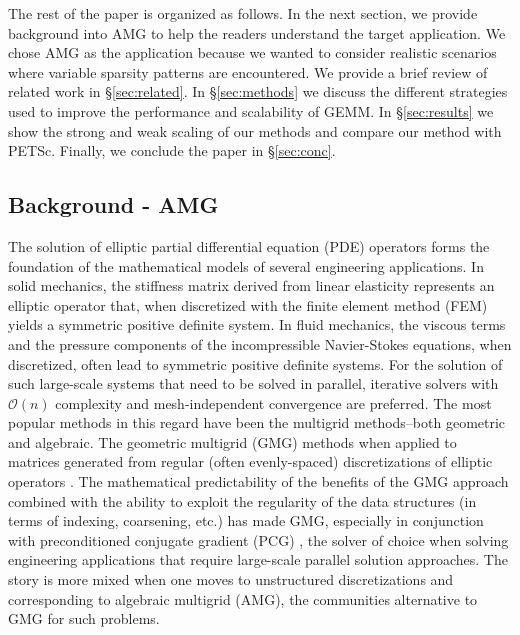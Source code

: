 The rest of the paper is organized as follows. In the next section, we provide background into AMG to help the readers understand the target application. We chose AMG as the application because we wanted to consider realistic scenarios where variable sparsity patterns are encountered. We provide a brief review of related work in \S\ref{sec:related}.  In \S\ref{sec:methods} we discuss the different strategies used to improve the performance and scalability of \textsc{GEMM}. In \S\ref{sec:results} we show the strong and weak scaling of our methods and compare our method with PETSc. Finally, we conclude the paper in \S\ref{sec:conc}.

\subsection{Background - AMG}
\label{sec:bg}

The solution of elliptic partial differential equation (PDE) operators forms the 
foundation of the mathematical models of several engineering applications.
In solid mechanics, the stiffness matrix derived from linear elasticity represents an elliptic
operator that, when discretized with the finite element method (FEM) yields a symmetric positive
definite system. In fluid mechanics, the viscous terms and the pressure components of
the incompressible Navier-Stokes equations, when discretized, often lead to symmetric
positive definite systems. 
For the solution of such large-scale systems that need to be solved in parallel, iterative solvers 
with $\mathcal{O}(n)$ complexity and mesh-independent convergence are preferred. 
%
The most popular methods in this regard have been the multigrid methods--both geometric and algebraic. 
The geometric multigrid (GMG) methods when applied
to matrices generated from regular (often evenly-spaced) discretizations of elliptic operators \cite{MadayMunoz88,BrambleZhang00,Brenner02,GholamiMalhotraSundar2016}.
The mathematical predictability of the benefits of the GMG approach combined with the ability to
exploit the regularity of the data structures (in terms of indexing, coarsening, etc.) has made
GMG, especially in conjunction with preconditioned conjugate gradient (PCG) \cite{Braess86,TatebeOyanagi94}, the solver of choice when solving engineering applications that require large-scale
parallel solution approaches.  The story is more mixed when one moves to unstructured discretizations
and corresponding to algebraic multigrid (AMG), the communities alternative to GMG for such problems.  

